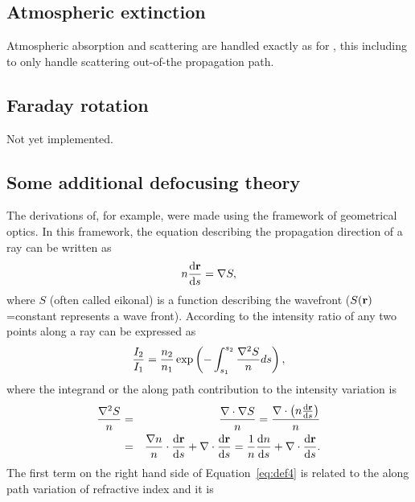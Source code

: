 \subsection{Atmospheric extinction}
\label{sec:rlink:atmext}
%
Atmospheric absorption and scattering are handled exactly as for
, this including to only handle scattering
out-of-the propagation path.



\subsection{Faraday rotation}
\label{sec:rlink:farrot}
%
Not yet implemented.



\subsection{Some additional defocusing theory}
\label{sec:rlink:defoc2}
%
The derivations of, for example, \citet{haugstad:78:turbu} were made using the
framework of geometrical optics. In this framework, the equation describing the
propagation direction of a ray can be written as
\begin{equation}
\label{eq:eik}
n\frac{\mathrm{d} \bf{\ensuremath{r}}}{\mathrm{d} s}=\nabla S,
\end{equation}
where \(S\) (often called eikonal) is a function describing the wavefront
(\(S(\bf{\ensuremath{r}})\)=constant represents a wave front). According to
\cite{born:80} the intensity ratio of any two points along a ray can be
expressed as
\begin{equation}
\frac{I_{2}}{I_{1}}=\frac{n_{2}}{n_{1}}
\exp \left(-\int_{s_{1}}^{s_{2}}\frac{\nabla^{2}S}{n}ds\right),
\end{equation}
where the integrand 
or the along path contribution to the intensity variation is
\begin{eqnarray}
\label{eq:def4}
\frac{\nabla^{2}S}{n} &=& \frac{\nabla \cdot \nabla S}{n}
=\frac{\nabla \cdot \left(n\frac{\mathrm{d} \bf{\ensuremath{r}}}{\mathrm{d} s}\right)}{n} \nonumber \\
& = & 
\frac{\nabla n}{n} \cdot \frac{\mathrm{d} \bf{\ensuremath{r}}}{\mathrm{d} s}
+\nabla \cdot \frac{\mathrm{d} \bf{\ensuremath{r}}}{\mathrm{d} s}=
\frac{1}{n}\frac{\mathrm{d} n}{\mathrm{d} s}+\nabla \cdot \frac{\mathrm{d} \bf{\ensuremath{r}}}{\mathrm{d} s}. 
\end{eqnarray}
The first term on the right hand side of Equation~\ref{eq:def4}
is related to the along path variation of refractive index and it is 
